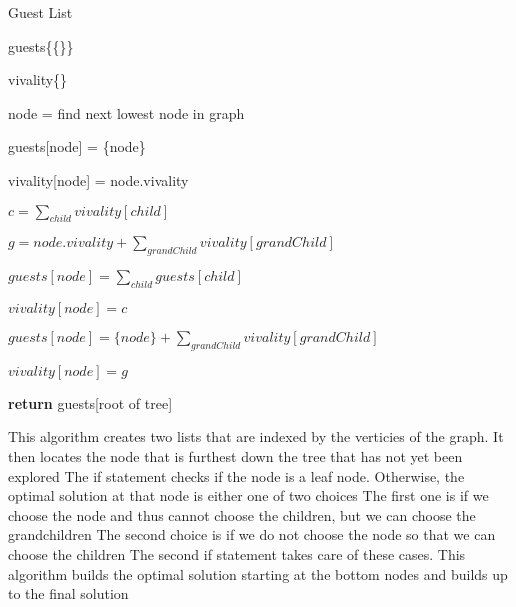 \documentclass{article}
\begin{document}
\begin{algorithm}

    \caption{Guest List}\label{guests}

    \begin{algorithmic}[1]


        \State guests\{\{\}\}

        \State vivality\{\}


			\State node = find next lowest node in graph


				\State guests[node] = \{node\}

				\State vivality[node] = node.vivality

			\Else

				\State $c = \sum_{child} vivality[child]$

				\State $g = node.vivality + \sum_{grandChild} vivality[grandChild]$




					\State $guests[node] = \sum_{child} guests[child]$

					\State $vivality[node] = c$

				\Else

					\State $guests[node] = \{node\} + \sum_{grandChild} vivality[grandChild]$

					\State $vivality[node] = g$

				\EndIf

			\EndIf

		\EndFor



       \State \textbf{return} guests[root of tree]



    \EndFunction

    \end{algorithmic}

\end{algorithm}



This algorithm creates two lists that are indexed by the verticies of the graph. It then locates the node that is furthest down the tree that has not yet been explored
 The if statement checks if the node is a leaf node. Otherwise, the optimal solution at that node is either one of two choices
 The first one is if we choose the node and thus cannot choose the children, but we can choose the grandchildren
 The second choice is if we do not choose the node so that we can choose the children
 The second if statement takes care of these cases. This algorithm builds the optimal solution starting at the bottom nodes and builds up to the final solution
 
\end{document}
